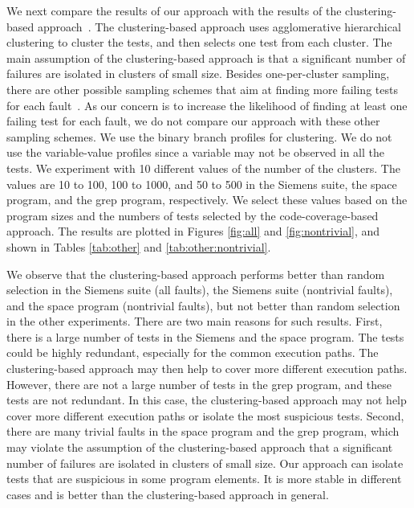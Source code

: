 \documentclass{sig-alternate}
\begin{document}
We next compare the results of our approach with the results of the
clustering-based approach~\cite{Dickinson01a}. The clustering-based
approach uses agglomerative hierarchical clustering to cluster the
tests, and then selects one test from each cluster. The main
assumption of the clustering-based approach is that a significant
number of failures are isolated in clusters of small size. Besides
one-per-cluster sampling, there are other possible sampling schemes
that aim at finding more failing tests for each
fault~\cite{Dickinson01b}. As our concern is to increase the
likelihood of finding at least one failing test for each fault, we
do not compare our approach with these other sampling schemes. We
use the binary branch profiles for clustering. We do not use the
variable-value profiles since a variable may not be observed in all
the tests. We experiment with 10 different values of the number of
the clusters. The values are 10 to 100, 100 to 1000, and 50 to 500
in the Siemens suite, the space program, and the grep program,
respectively. We select these values based on the program sizes and
the numbers of tests selected by the code-coverage-based approach.
The results are plotted in Figures \ref{fig:all} and
\ref{fig:nontrivial}, and shown in Tables \ref{tab:other} and
\ref{tab:other:nontrivial}.

We observe that the clustering-based approach performs better than
random selection in the Siemens suite (all faults), the Siemens
suite (nontrivial faults), and the space program (nontrivial
faults), but not better than random selection in the other
experiments. There are two main reasons for such results. First,
there is a large number of tests in the Siemens and the space
program. The tests could be highly redundant, especially for the
common execution paths. The clustering-based approach may then help
to cover more different execution paths. However, there are not a
large number of tests in the grep program, and these tests are not
redundant. In this case, the clustering-based approach may not help
cover more different execution paths or isolate the most suspicious
tests. Second, there are many trivial faults in the space program
and the grep program, which may violate the assumption of the
clustering-based approach that a significant number of failures are
isolated in clusters of small size. Our approach can isolate tests
that are suspicious in some program elements. It is more stable in
different cases and is better than the clustering-based approach in
general.
\end{document}
